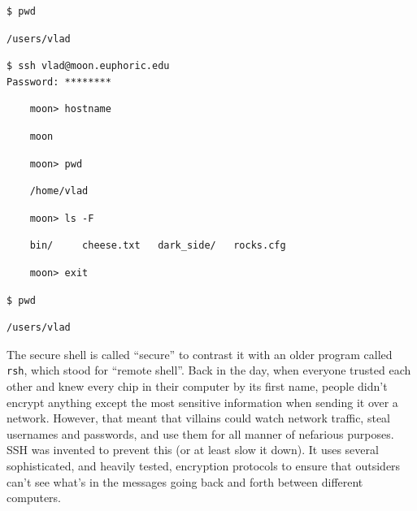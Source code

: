 \documentclass{book}
\begin{document}
\begin{verbatim}
$ pwd
\end{verbatim}

\begin{verbatim}
/users/vlad
\end{verbatim}

\begin{verbatim}
$ ssh vlad@moon.euphoric.edu
Password: ********
\end{verbatim}

\begin{verbatim}
    moon> hostname
\end{verbatim}

\begin{verbatim}
    moon
\end{verbatim}

\begin{verbatim}
    moon> pwd
\end{verbatim}

\begin{verbatim}
    /home/vlad
\end{verbatim}

\begin{verbatim}
    moon> ls -F
\end{verbatim}

\begin{verbatim}
    bin/     cheese.txt   dark_side/   rocks.cfg
\end{verbatim}

\begin{verbatim}
    moon> exit
\end{verbatim}

\begin{verbatim}
$ pwd
\end{verbatim}

\begin{verbatim}
/users/vlad
\end{verbatim}

The secure shell is called ``secure'' to contrast it with an older
program called \texttt{rsh}, which stood for ``remote shell''. Back in
the day, when everyone trusted each other and knew every chip in their
computer by its first name, people didn't encrypt anything except the
most sensitive information when sending it over a network. However, that
meant that villains could watch network traffic, steal usernames and
passwords, and use them for all manner of nefarious purposes. SSH was
invented to prevent this (or at least slow it down). It uses several
sophisticated, and heavily tested, encryption protocols to ensure that
outsiders can't see what's in the messages going back and forth between
different computers.
\end{document}
